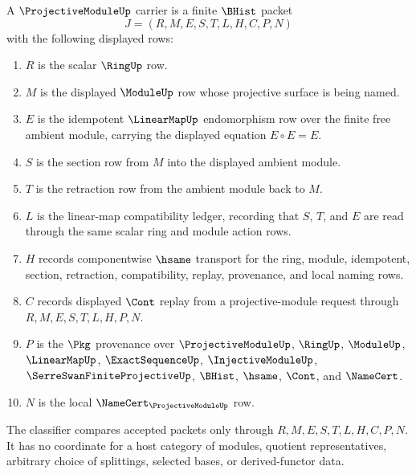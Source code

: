 \begin{definition}
\label{def:projective-module-carrier}
A $\ProjectiveModuleUp$ carrier is a finite $\BHist$ packet
$$
J=(R,M,E,S,T,L,H,C,P,N)
$$
with the following displayed rows:
\begin{enumerate}
\item $R$ is the scalar $\RingUp$ row.
\item $M$ is the displayed $\ModuleUp$ row whose projective surface is being named.
\item $E$ is the idempotent $\LinearMapUp$ endomorphism row over the finite free ambient module, carrying the displayed equation $E\circ E=E$.
\item $S$ is the section row from $M$ into the displayed ambient module.
\item $T$ is the retraction row from the ambient module back to $M$.
\item $L$ is the linear-map compatibility ledger, recording that $S$, $T$, and $E$ are read through the same scalar ring and module action rows.
\item $H$ records componentwise $\hsame$ transport for the ring, module, idempotent, section, retraction, compatibility, replay, provenance, and local naming rows.
\item $C$ records displayed $\Cont$ replay from a projective-module request through $R,M,E,S,T,L,H,P,N$.
\item $P$ is the $\Pkg$ provenance over $\ProjectiveModuleUp$, $\RingUp$, $\ModuleUp$, $\LinearMapUp$, $\ExactSequenceUp$, $\InjectiveModuleUp$, $\SerreSwanFiniteProjectiveUp$, $\BHist$, $\hsame$, $\Cont$, and $\NameCert$.
\item $N$ is the local $\NameCert_{\ProjectiveModuleUp}$ row.
\end{enumerate}
The classifier compares accepted packets only through $R,M,E,S,T,L,H,C,P,N$. It has no coordinate for a host category of modules, quotient representatives, arbitrary choice of splittings, selected bases, or derived-functor data.
\end{definition}

